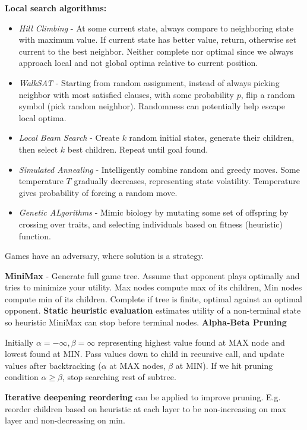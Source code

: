 \documentclass[a4paper,10pt,twocolumn]{article}
\begin{document}
\begin{tcolorbox}[title=Heuristic Search, module]
    \textbf{Local search algorithms:}
    \begin{itemize}
        \item \textit{Hill Climbing} - At some current state, always compare to neighboring state with maximum value. If current state has better value, return, otherwise set current to the best neighbor. Neither complete nor optimal since we always approach local and not global optima relative to current position.
        \item \textit{WalkSAT} - Starting from random assignment, instead of always picking neighbor with most satisfied clauses, with some probability $p$, flip a random symbol (pick random neighbor). Randomness can potentially help escape local optima.
        \item \textit{Local Beam Search} - Create $k$ random initial states, generate their children, then select $k$ best children. Repeat until goal found.
        \item \textit{Simulated Annealing} - Intelligently combine random and greedy moves. Some temperature $T$ gradually decreases, representing state volatility. Temperature gives probability of forcing a random move.
        \item \textit{Genetic ALgorithms} - Mimic biology by mutating some set of offspring by crossing over traits, and selecting individuals based on fitness (heuristic) function.
    \end{itemize}

\end{tcolorbox}

\begin{tcolorbox}[title=Game Search, module]
    Games have an adversary, where solution is a strategy.

    \textbf{MiniMax} - Generate full game tree. Assume that opponent plays optimally and tries to minimize your utility. Max nodes compute max of its children, Min nodes compute min of its children. Complete if tree is finite, optimal against an optimal opponent.
    \textbf{Static heuristic evaluation} estimates utility of a non-terminal state so heuristic MiniMax can stop before terminal nodes.
    \textbf{Alpha-Beta Pruning}

    Initially $\alpha = -\infty, \beta = \infty$ representing highest value found at MAX node and lowest found at MIN. Pass values down to child in recursive call, and update values after backtracking ($\alpha$ at MAX nodes, $\beta$ at MIN). If we hit pruning condition $\alpha \ge \beta$, stop searching rest of subtree.

    \textbf{Iterative deepening reordering} can be applied to improve pruning. E.g. reorder children based on heuristic at each layer to be non-increasing on max layer and non-decreasing on min.


\end{tcolorbox}
\end{document}
